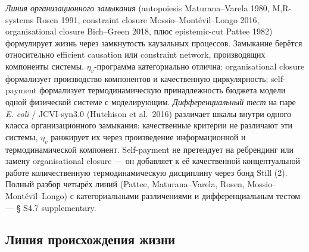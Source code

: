 \documentclass[pdflatex,sn-mathphys-ay]{sn-jnl}
\begin{document}
\emph{Линия организационного замыкания} (autopoiesis Maturana--Varela 1980, M,R-systems Rosen 1991, constraint closure Mossio--Montévil--Longo 2016, organisational closure Bich--Green 2018, плюс epistemic-cut Pattee 1982) формулирует жизнь через замкнутость каузальных процессов. Замыкание берётся относительно efficient causation или constraint network, производящих компоненты системы. \(\eta_v\)-программа категориально отлична: organisational closure формализует производство компонентов и качественную циркулярность; self-payment формализует термодинамическую принадлежность бюджета модели одной физической системе с моделирующим. \emph{Дифференциальный тест} на паре \emph{E. coli} / JCVI-syn3.0 (Hutchison et al.~2016) различает шкалы внутри одного класса организационного замыкания: качественные критерии не различают эти системы, \(\eta_v\) ранжирует их через произведение информационной и термодинамической компонент. Self-payment не претендует на ребрендинг или замену organisational closure --- он добавляет к её качественной концептуальной работе количественную термодинамическую дисциплину через бонд Still (2). Полный разбор четырёх линий (Pattee, Maturana--Varela, Rosen, Mossio--Montévil--Longo) с категориальными различениями и дифференциальным тестом --- § S4.7 supplementary.

\subsection{Линия происхождения жизни}\label{ux43bux438ux43dux438ux44f-ux43fux440ux43eux438ux441ux445ux43eux436ux434ux435ux43dux438ux44f-ux436ux438ux437ux43dux438}
\end{document}
